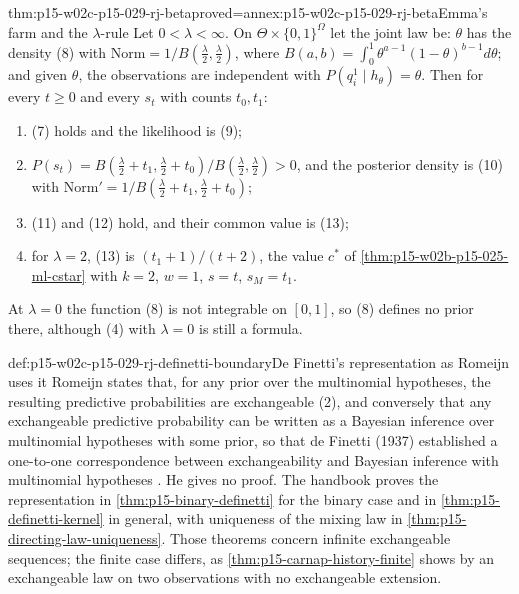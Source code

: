 \begin{hbtheorem}{thm:p15-w02c-p15-029-rj-beta}{proved=annex:p15-w02c-p15-029-rj-beta}{Emma's farm and the \texorpdfstring{\(\lambda\)}{lambda}-rule}
Let \(0<\lambda<\infty\). On \(\Theta\times\{0,1\}^{\Omega}\) let the
joint law be: \(\theta\) has the density (8) with
\(\mathrm{Norm}=1/B(\tfrac\lambda2,\tfrac\lambda2)\), where
\(B(a,b)=\int_0^1\theta^{a-1}(1-\theta)^{b-1}d\theta\); and given
\(\theta\), the observations are independent with
\(P(q^1_i\mid h_\theta)=\theta\). Then for every \(t\ge0\) and every
\(s_t\) with counts \(t_0,t_1\):
\begin{enumerate}
\item (7) holds and the likelihood is (9);
\item \(P(s_t)=B(\tfrac\lambda2+t_1,\tfrac\lambda2+t_0)/B(\tfrac\lambda2,\tfrac\lambda2)>0\),
  and the posterior density is (10) with
  \(\mathrm{Norm}'=1/B(\tfrac\lambda2+t_1,\tfrac\lambda2+t_0)\);
\item (11) and (12) hold, and their common value is (13);
\item for \(\lambda=2\), (13) is \((t_1+1)/(t+2)\), the value \(c^*\) of
  \cref{thm:p15-w02b-p15-025-ml-cstar} with \(k=2\), \(w=1\),
  \(s=t\), \(s_M=t_1\).
\end{enumerate}
At \(\lambda=0\) the function (8) is not integrable on \([0,1]\), so
(8) defines no prior there, although (4) with \(\lambda=0\) is still a
formula.
\end{hbtheorem}

\begin{proofboundary}{def:p15-w02c-p15-029-rj-definetti-boundary}{De Finetti's representation as Romeijn uses it}
Romeijn states that, for any prior over the multinomial hypotheses, the
resulting predictive probabilities are exchangeable (2), and conversely
that any exchangeable predictive probability can be written as a
Bayesian inference over multinomial hypotheses with some prior, so that
de Finetti (1937) established a one-to-one correspondence between
exchangeability and Bayesian inference with multinomial hypotheses
\cite[pp.~635--636]{Romeijn2011InductiveLogicStatistics}. He gives no
proof. The handbook proves the representation in
\cref{thm:p15-binary-definetti} for the binary case and in
\cref{thm:p15-definetti-kernel} in general, with uniqueness of the
mixing law in \cref{thm:p15-directing-law-uniqueness}. Those theorems
concern infinite exchangeable sequences; the finite case differs, as
\cref{thm:p15-carnap-history-finite} shows by an exchangeable law on two
observations with no exchangeable extension.
\end{proofboundary}

